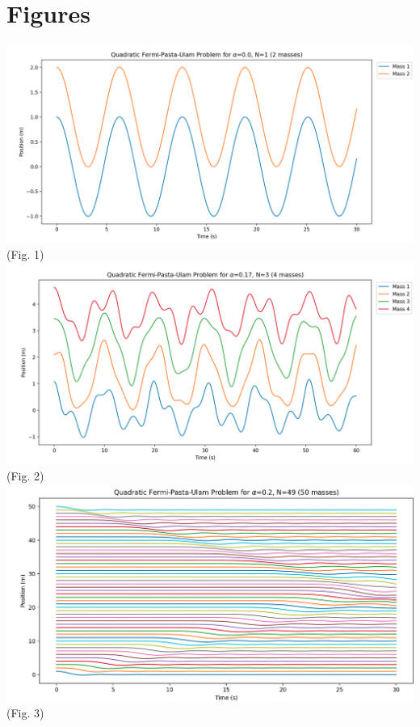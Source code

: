 \documentclass{article}
\begin{document}
\section{Figures}
\begin{center}
    \includegraphics[scale=.33]{2mass.png}\\ 
    (Fig. 1)\\ 
    \includegraphics[scale=.33]{4mass.png}\\ 
    (Fig. 2)\\ 
    \includegraphics[scale=.33]{50mass.png}\\ 
    (Fig. 3)\\ 

\end{center}
\end{document}
